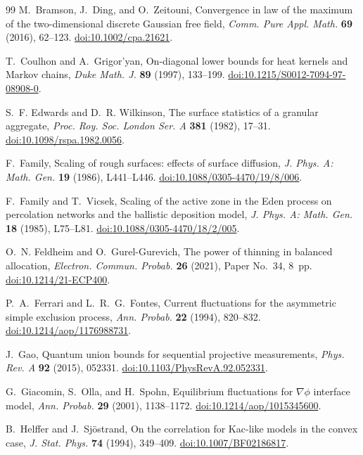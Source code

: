 \documentclass[11pt]{article}
\theoremstyle{remark}
\newcommand{\doi}[1]{\href{https://doi.org/#1}{doi:#1}}
\begin{document}
\begin{thebibliography}{99}
M.~Bramson, J.~Ding, and O.~Zeitouni,
\newblock Convergence in law of the maximum of the two-dimensional discrete Gaussian free field,
\newblock \emph{Comm. Pure Appl. Math.} \textbf{69} (2016), 62--123.
\newblock \doi{10.1002/cpa.21621}.

T.~Coulhon and A.~Grigor'yan,
\newblock On-diagonal lower bounds for heat kernels and Markov chains,
\newblock \emph{Duke Math. J.} \textbf{89} (1997), 133--199.
\newblock \doi{10.1215/S0012-7094-97-08908-0}.

S.~F. Edwards and D.~R. Wilkinson,
\newblock The surface statistics of a granular aggregate,
\newblock \emph{Proc. Roy. Soc. London Ser. A} \textbf{381} (1982), 17--31.
\newblock \doi{10.1098/rspa.1982.0056}.

F.~Family,
\newblock Scaling of rough surfaces: effects of surface diffusion,
\newblock \emph{J. Phys. A: Math. Gen.} \textbf{19} (1986), L441--L446.
\newblock \doi{10.1088/0305-4470/19/8/006}.

F.~Family and T.~Vicsek,
\newblock Scaling of the active zone in the Eden process on percolation networks and the ballistic deposition model,
\newblock \emph{J. Phys. A: Math. Gen.} \textbf{18} (1985), L75--L81.
\newblock \doi{10.1088/0305-4470/18/2/005}.

O.~N. Feldheim and O.~Gurel-Gurevich,
\newblock The power of thinning in balanced allocation,
\newblock \emph{Electron. Commun. Probab.} \textbf{26} (2021), Paper No.~34, 8~pp.
\newblock \doi{10.1214/21-ECP400}.

P.~A.~Ferrari and L.~R.~G.~Fontes,
\newblock Current fluctuations for the asymmetric simple exclusion process,
\newblock \emph{Ann. Probab.} \textbf{22} (1994), 820--832.
\newblock \doi{10.1214/aop/1176988731}.

J.~Gao,
\newblock Quantum union bounds for sequential projective measurements,
\newblock \emph{Phys. Rev. A} \textbf{92} (2015), 052331.
\newblock \doi{10.1103/PhysRevA.92.052331}.

G.~Giacomin, S.~Olla, and H.~Spohn,
\newblock Equilibrium fluctuations for $\nabla\phi$ interface model,
\newblock \emph{Ann. Probab.} \textbf{29} (2001), 1138--1172.
\newblock \doi{10.1214/aop/1015345600}.

B.~Helffer and J.~Sj\"ostrand,
\newblock On the correlation for Kac-like models in the convex case,
\newblock \emph{J. Stat. Phys.} \textbf{74} (1994), 349--409.
\newblock \doi{10.1007/BF02186817}.


\end{thebibliography}
\end{document}
